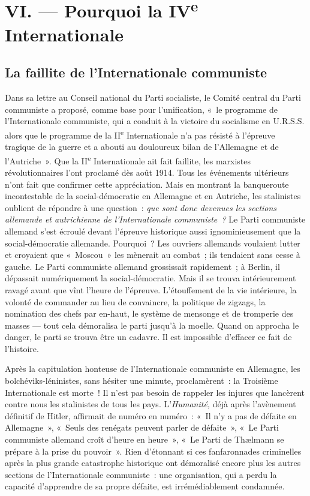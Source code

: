 \documentclass[french,twoside]{book} %
\begin{document}
\section[{VI. — Pourquoi la IVe Internationale}]{VI. — Pourquoi la IV\textsuperscript{e} Internationale}
\subsection[{La faillite de l’Internationale communiste}]{La faillite de l’Internationale communiste}
\noindent Dans sa lettre au Conseil national du Parti socialiste, le Comité central du Parti communiste a proposé, comme base pour l’unification, « le programme de l’Internationale communiste, qui a conduit à la victoire du socialisme en U.R.S.S. alors que le programme de la II\textsuperscript{e} Internationale n’a pas résisté à l’épreuve tragique de la guerre et a abouti au douloureux bilan de l’Allemagne et de l’Autriche ». Que la II\textsuperscript{e} Internationale ait fait faillite, les marxistes révolutionnaires l’ont proclamé dès août 1914. Tous les événements ultérieurs n’ont fait que confirmer cette appréciation. Mais en montrant la banqueroute incontestable de la social-démocratie en Allemagne et en Autriche, les stalinistes oublient de répondre à une question : \emph{que sont donc devenues les sections allemande et autrichienne de l’Internationale communiste ? }Le Parti communiste allemand s’est écroulé devant l’épreuve historique aussi ignominieusement que la social-démocratie allemande. Pourquoi ? Les ouvriers allemands voulaient lutter et croyaient que « Moscou » les mènerait au combat ; ils tendaient sans cesse à gauche. Le Parti  communiste allemand grossissait rapidement ; à Berlin, il dépassait numériquement la social-démocratie. Mais il se trouva intérieurement ravagé avant que vînt l’heure de l’épreuve. L’étouffement de la vie intérieure, la volonté de commander au lieu de convaincre, la politique de zigzags, la nomination des chefs par en-haut, le système de mensonge et de tromperie des masses — tout cela démoralisa le parti jusqu’à la moelle. Quand on approcha le danger, le parti se trouva être un cadavre. Il est impossible d’effacer ce fait de l’histoire.\par
Après la capitulation honteuse de l’Internationale communiste en Allemagne, les bolchéviks-léninistes, sans hésiter une minute, proclamèrent : la Troisième Internationale est morte ! Il n’est pas besoin de rappeler les injures que lancèrent contre nous les stalinistes de tous les pays. L’\emph{Humanité,} déjà après l’avènement définitif de Hitler, affirmait de numéro en numéro : « Il n’y a pas de défaite en Allemagne », « Seuls des renégats peuvent parler de défaite », « Le Parti communiste allemand croît d’heure en heure », « Le Parti de Thælmann se prépare à la prise du pouvoir ». Rien d’étonnant si ces fanfaronnades criminelles après la plus grande catastrophe historique ont démoralisé encore plus les autres sections de l’Internationale communiste : une organisation, qui a perdu la capacité d’apprendre de sa propre défaite, est irrémédiablement condamnée.
\end{document}
